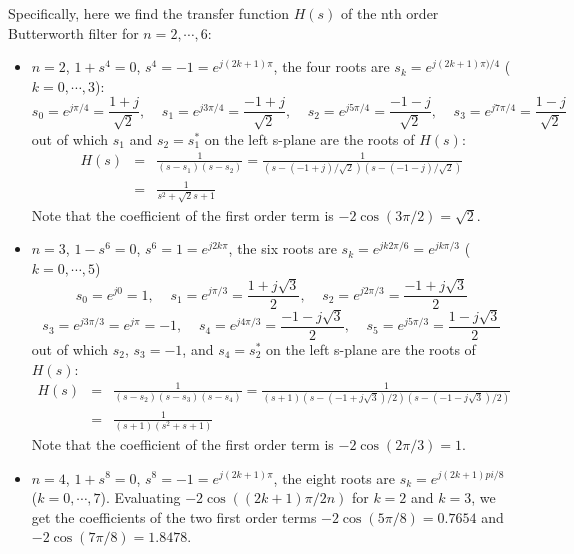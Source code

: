 \documentclass{article}
\begin{document}
  Specifically, here we find the transfer function $H(s)$ of the nth order
  Butterworth filter for $n=2,\cdots,6$:
  \begin{itemize}
  \item $n=2$, $1+s^4=0$, $s^4=-1=e^{j(2k+1)\pi}$, the four roots are
    $s_k=e^{j(2k+1)\pi)/4}$ ($k=0,\cdots,3$):
    \begin{equation}
    s_0=e^{j\pi/4}=\frac{1+j}{\sqrt{2}},\;\;\;\;
    s_1=e^{j3\pi/4}=\frac{-1+j}{\sqrt{2}},\;\;\;\;
    s_2=e^{j5\pi/4}=\frac{-1-j}{\sqrt{2}},\;\;\;\;
    s_3=e^{j7\pi/4}=\frac{1-j}{\sqrt{2}}
    \end{equation}
    out of which $s_1$ and $s_2=s_1^*$ on the left s-plane are the roots of 
    $H(s)$:
    \begin{eqnarray}
    H(s)&=&\frac{1}{(s-s_1)(s-s_2)}=\frac{1}{(s-(-1+j)/\sqrt{2})(s-(-1-j)/\sqrt{2})}
    \nonumber \\
    &=&\frac{1}{s^2+\sqrt{2}s+1}
    \end{eqnarray}
    Note that the coefficient of the first order term is $-2\cos(3\pi/2)=\sqrt{2}$.
  \item $n=3$, $1-s^6=0$, $s^6=1=e^{j2k\pi}$, the six roots are
    $s_k=e^{j k2\pi/6}=e^{j k\pi/3}$ ($k=0,\cdots,5$)
    \begin{equation}
    s_0=e^{j0}=1,\;\;\;\;
    s_1=e^{j\pi/3}=\frac{1+j\sqrt{3}}{2},\;\;\;\;s_2=e^{j2\pi/3}=\frac{-1+j\sqrt{3}}{2}
    \end{equation}
    \begin{equation}
    s_3=e^{j3\pi/3}=e^{j\pi}=-1,\;\;\;\;
    s_4=e^{j4\pi/3}=\frac{-1-j\sqrt{3}}{2},\;\;\;\;s_5=e^{j5\pi/3}=\frac{1-j\sqrt{3}}{2}
    \end{equation}
    out of which $s_2$, $s_3=-1$, and $s_4=s_2^*$ on the left s-plane 
    are the roots of $H(s)$:
    \begin{eqnarray}
    H(s)&=&\frac{1}{(s-s_2)(s-s_3)(s-s_4)}
    =\frac{1}{(s+1)(s-(-1+j\sqrt{3})/2)(s-(-1-j\sqrt{3})/2)}
    \nonumber \\
    &=&\frac{1}{(s+1)(s^2+s+1)}
    \end{eqnarray}
    Note that the coefficient of the first order term is $-2\cos(2\pi/3)=1$.
  \item $n=4$, $1+s^8=0$, $s^8=-1=e^{j(2k+1)\pi}$, the eight roots are
    $s_k=e^{j(2k+1)pi/8}$ ($k=0,\cdots,7$).
    Evaluating $-2\cos((2k+1)\pi/2n)$ for $k=2$ and $k=3$, we get the
    coefficients of the two first order terms
    $-2\cos(5\pi/8)=0.7654$ and $-2\cos(7\pi/8)=1.8478$.
    \begin{equation}

\end{equation}
\end{itemize}
\end{document}
